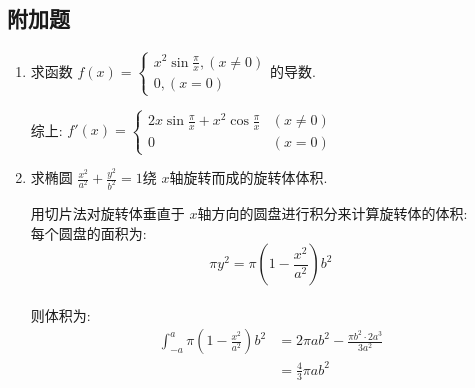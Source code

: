 \begin{questions}
	\section*{附加题}
	\question[10]
	\begin{enumerate}[label=(\arabic*)]
		\item 求函数 \( f(x) = \begin{cases}
			      x^2\sin\frac{\pi}{x}, (x \neq 0) \\
			      0, (x=0)
		      \end{cases} \)的导数.
		      \begin{solution}
			      综上:
			      \begin{math}
				      f'(x) = \left\{\begin{array}{ll}
					      2x\sin\frac{\pi}{x} + x^2\cos\frac{\pi}{x} & (x \neq 0) \\
					      0                                          & (x = 0)
				      \end{array}\right.
			      \end{math}
		      \end{solution}

		\item 求椭圆 \( \frac{x^2}{a^2} + \frac{y^2}{b^2} = 1 \)绕 $x$轴旋转而成的旋转体体积.
		      \begin{solution}
			      用切片法对旋转体垂直于 \( x \)轴方向的圆盘进行积分来计算旋转体的体积:\\
			      每个圆盘的面积为: \[ \pi y^2 = \pi (1-\frac{x^2}{a^2})b^2 \] \\
			      则体积为:
			      \begin{align*}
				      \int_{-a}^{a}\pi(1-\frac{x^2}{a^2})b^2 & = 2\pi ab^2 - \frac{\pi b^2\cdot 2a^3}{3a^2} \\
				                                             & = \frac{4}{3}\pi ab^2
			      \end{align*}


\end{solution}
\end{enumerate}
\end{questions}
